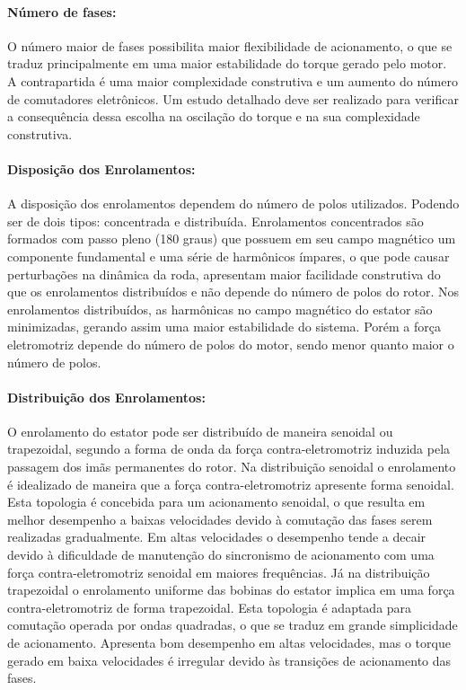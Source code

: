 \paragraph{Número de fases:}\label{sec:motor:fases}

O número maior de fases possibilita maior flexibilidade de acionamento, o que se traduz principalmente em uma maior estabilidade do torque gerado pelo motor. A contrapartida é uma maior complexidade construtiva e um aumento do número de comutadores eletrônicos. Um estudo detalhado deve ser realizado para verificar a consequência dessa escolha na oscilação do torque e na sua complexidade construtiva.

\paragraph{Disposição dos Enrolamentos:}\label{sec:motor:disposição}

A disposição dos enrolamentos dependem do número de polos utilizados.
Podendo ser de dois tipos: concentrada e distribuída. Enrolamentos concentrados são formados com passo pleno (180 graus) que possuem em seu campo magnético um componente fundamental e uma série de harmônicos ímpares, o que pode causar perturbações na dinâmica da roda, apresentam maior facilidade construtiva do que os enrolamentos distribuídos e não depende do número de polos do rotor. Nos enrolamentos distribuídos, as harmônicas no campo magnético do estator são minimizadas, gerando assim uma maior estabilidade do sistema. Porém a força eletromotriz depende do número de polos do motor, sendo menor quanto maior o número de polos.

\paragraph{Distribuição dos Enrolamentos:}\label{sec:motor:distribuicao}

O enrolamento do estator pode ser distribuído de maneira senoidal ou trapezoidal, segundo a forma de onda da força contra-eletromotriz induzida pela passagem dos imãs
permanentes do rotor. Na distribuição senoidal o enrolamento é idealizado de maneira que a força contra-eletromotriz apresente forma senoidal. Esta topologia é concebida para um acionamento senoidal, o que resulta em melhor desempenho a baixas velocidades devido à comutação das fases serem realizadas gradualmente. Em altas velocidades o desempenho tende a decair devido à dificuldade de manutenção do sincronismo de acionamento com uma força contra-eletromotriz senoidal em maiores frequências. Já na distribuição trapezoidal o enrolamento uniforme das bobinas do estator implica em uma força contra-eletromotriz de forma trapezoidal. Esta topologia é adaptada para comutação operada por ondas quadradas, o que se traduz em grande simplicidade de acionamento. Apresenta bom desempenho em altas velocidades, mas o torque gerado em baixa velocidades é irregular devido às transições de acionamento das fases.
	
